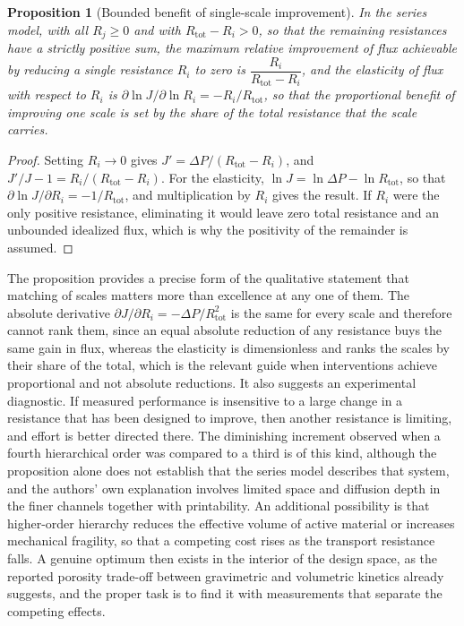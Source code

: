 \documentclass[11pt]{article}
\newtheorem{proposition}{Proposition}
\theoremstyle{definition}
\begin{document}
\begin{proposition}[Bounded benefit of single-scale improvement]
\label{prop:series}
In the series model, with all $R_j\ge0$ and with $R_{\mathrm{tot}}-R_i>0$, so that the remaining resistances have a strictly positive sum, the maximum relative improvement of flux achievable by reducing a single resistance $R_i$ to zero is $\dfrac{R_i}{R_{\mathrm{tot}}-R_i}$, and the elasticity of flux with respect to $R_i$ is $\partial\ln J/\partial\ln R_i=-R_i/R_{\mathrm{tot}}$, so that the proportional benefit of improving one scale is set by the share of the total resistance that the scale carries.
\end{proposition}

\begin{proof}
Setting $R_i\to0$ gives $J'=\Delta P/(R_{\mathrm{tot}}-R_i)$, and $J'/J-1=R_i/(R_{\mathrm{tot}}-R_i)$. For the elasticity, $\ln J=\ln\Delta P-\ln R_{\mathrm{tot}}$, so that $\partial\ln J/\partial R_i=-1/R_{\mathrm{tot}}$, and multiplication by $R_i$ gives the result. If $R_i$ were the only positive resistance, eliminating it would leave zero total resistance and an unbounded idealized flux, which is why the positivity of the remainder is assumed. \qedhere
\end{proof}

The proposition provides a precise form of the qualitative statement that matching of scales matters more than excellence at any one of them. The absolute derivative $\partial J/\partial R_i=-\Delta P/R_{\mathrm{tot}}^2$ is the same for every scale and therefore cannot rank them, since an equal absolute reduction of any resistance buys the same gain in flux, whereas the elasticity is dimensionless and ranks the scales by their share of the total, which is the relevant guide when interventions achieve proportional and not absolute reductions. It also suggests an experimental diagnostic. If measured performance is insensitive to a large change in a resistance that has been designed to improve, then another resistance is limiting, and effort is better directed there. The diminishing increment observed when a fourth hierarchical order was compared to a third \cite{bai2026} is of this kind, although the proposition alone does not establish that the series model describes that system, and the authors' own explanation involves limited space and diffusion depth in the finer channels together with printability. An additional possibility is that higher-order hierarchy reduces the effective volume of active material or increases mechanical fragility, so that a competing cost rises as the transport resistance falls. A genuine optimum then exists in the interior of the design space, as the reported porosity trade-off between gravimetric and volumetric kinetics already suggests, and the proper task is to find it with measurements that separate the competing effects.
\end{document}
